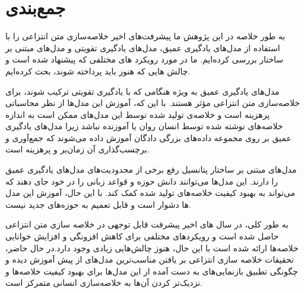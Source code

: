 \chapter{جمع‌بندی}
 به طور خلاصه در این پژوهش ما پیشرفت‌های اخیر خلاصه‌سازی متن انتزاعی را با استفاده از مدل‌های یادگیری عمیق، مدل‌های یادگیری تقویتی و مدل‌های مبتنی بر ساختار بررسی کرده‌ایم. ما در مورد رویکرد های مختلفی که پیشنهاد شده است و چالش هایی که هنوز باید پرداخته شوند، بحث کرده‌ایم.

مدل‌های یادگیری عمیق به ویژه هنگامی که با یادگیری تقویتی ترکیب شوند، برای خلاصه‌سازی متن انتزاعی  مؤثر هستند. با این که، آموزش این مدل‌ها  از نظر محاسباتی پرهزینه است و خلاصه‌ی تولید شده توسط این مدل‌های ممکن است  به اندازه خلاصه‌های نوشته شده توسط انسان روان یا آموزنده نباشد زیرا مدل‌های یادگیری عمیق بر روی مجموعه داده‌های بزرگی دادگان آموزش داده می‌شوند که جمع‌آوری و برچسب‌گذاری آن زمان‌بر و پرهزینه است.

مدل‌های مبتنی بر ساختار پتانسیل رفع برخی از محدودیت‌های مدل‌های یادگیری عمیق را دارند. این مدل‌ها می‌توانند دانش حوزه و قواعد زبانی را در خود جای دهند که می‌تواند به بهبود کیفیت خلاصه‌های تولید شده کمک کند. با این حال، آموزش این مدل ها دشوار است و قابل تعمیم به حوزه‌های جدید نیست.

به طور کلی، در سال های اخیر پیشرفت قابل توجهی در خلاصه سازی متن انتزاعی حاصل شده است و رویکردهای مختلفی برای کاهش افزونگی و افزایش خوانایی خلاصه‌ها ارائه شده است با این حال، هنوز چالش‌هایی زیادی وجود دارد.در حال حاضر، تحقیقات خلاصه سازی انتزاعی  بر یافتن مناسب‌ترین مدل‌های از پیش آموزش دیده و چگونگی تطبیق بازنمایی‌های به دست آمده از این مدل‌ها برای بهبود  کیفیت خلاصه‌ها و نزدیک‌تر کردن آن‌ها به  خلاصه‌سازی انسانی متمرکز است.
